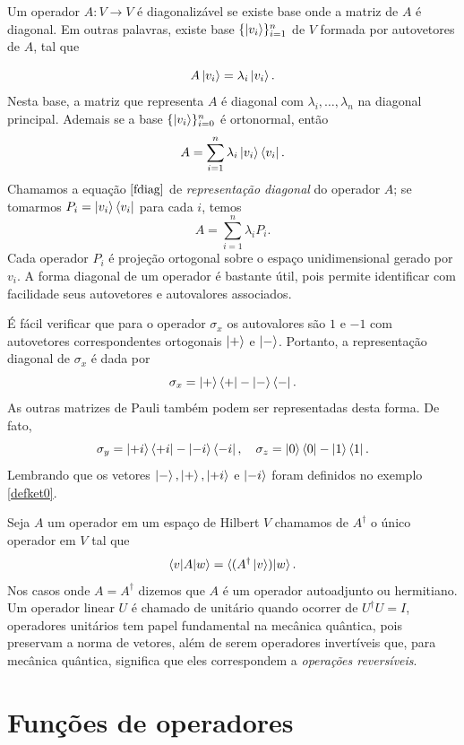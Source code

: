 Um operador $A: V\to V$ é diagonalizável se existe base onde a matriz de $A$ é diagonal. Em outras palavras, existe base $\{\ket{v_i}\}_{i=1}^n$ de $V$ formada por autovetores de $A$, tal que

$$
A\ket{v_i} = \lambda_i\ket{v_i}.
$$
Nesta base, a matriz que representa $A$ é diagonal com $\lambda_i, \dotso, \lambda_n$ na diagonal principal. Ademais se a base $\{\ket{v_i}\}_{i=0}^n$ é ortonormal, então
\begin{equation}\label{fdiag}
	A = \sum_{i=1}^n \lambda_i \ket{v_i}\bra{v_i}.
\end{equation}
Chamamos a equação $\eqref{fdiag}$ de \emph{representação diagonal} do operador $A$; se tomarmos $P_i = \ket{v_i}\bra{v_i}$ para cada $i$, temos
$$
A = \sum_{i=1}^n \lambda_i P_i.
$$
Cada operador $P_i$ é projeção ortogonal sobre o espaço unidimensional gerado por $v_i$. A forma diagonal de um operador é bastante útil, pois permite identificar com facilidade seus autovetores e autovalores associados.

\begin{example}
	É fácil verificar que para o operador $\sigma_x$ os autovalores são $1$ e $-1$ com  autovetores correspondentes ortogonais $\ket{+}$ e $\ket{-}$. Portanto, a representação diagonal de $\sigma_x$  é dada por
$$
\sigma_x = \ket{+}\bra{+} - \ket{-}\bra{-}.
$$
As outras matrizes de Pauli também podem ser representadas desta forma. De fato, 
\begin{equation*}
	\sigma_y = \ket{+i}\bra{+i} - \ket{-i}\bra{-i}, \quad	\sigma_z = \ket{0}\bra{0} - \ket{1}\bra{1}.
\end{equation*}
Lembrando que os vetores $\ket{-}, \ket{+}, \ket{+i}$ e $\ket{-i}$ foram definidos no exemplo \ref{defket0}.
\end{example}

Seja $A$ um operador em um espaço de Hilbert $V$ chamamos de $A^\dagger$ o único operador em $V$ tal que
\begin{equation}
	\braket{v|A|w} = \braket{(A^\dagger\ket{v})|w}.
\end{equation}
Nos casos onde $A=A^\dagger$ dizemos que $A$ é um operador autoadjunto ou hermitiano. Um operador linear $U$ é chamado de unitário quando ocorrer de $U^\dagger U = I$, operadores unitários tem papel fundamental na mecânica quântica, pois preservam a norma de vetores, além de serem operadores invertíveis que, para mecânica quântica, significa que eles correspondem a \emph{operações reversíveis}.

\section{Funções de operadores}
\label{sec:funcoes_operadores}

